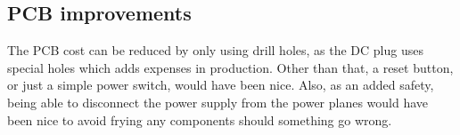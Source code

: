 \subsection{PCB improvements}
The PCB cost can be reduced by only using drill holes, as the DC plug uses
special holes which adds expenses in production. Other than that, a reset
button, or just a simple power switch, would have been nice. Also, as an added
safety, being able to disconnect the power supply from the power planes would
have been nice to avoid frying any components should something go wrong.
